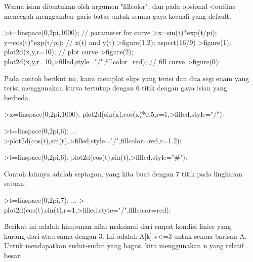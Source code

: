 \documentclass[12pt,arial,letterpaper]{book}
\begin{document}
\begin{eulercomment}
\begin{eulercomment}
\begin{eulercomment}
\begin{eulercomment}
\begin{eulercomment}
\begin{eulercomment}
\begin{eulercomment}
\begin{eulercomment}
\begin{eulercomment}
\begin{eulercomment}
\begin{eulercomment}
\begin{eulercomment}
\begin{eulercomment}
\begin{eulercomment}
\begin{eulercomment}
\begin{eulercomment}
\begin{eulercomment}
Warna isian ditentukan oleh argumen "fillcolor", dan pada opsional
\textless{}outline mencegah menggambar garis batas untuk semua gaya kecuali yang
default.
\end{eulercomment}
\begin{eulerprompt}
>t=linspace(0,2pi,1000); // parameter for curve
>x=sin(t)*exp(t/pi); y=cos(t)*exp(t/pi); // x(t) and y(t)
>figure(1,2); aspect(16/9)
>figure(1); plot2d(x,y,r=10); // plot curve
>figure(2); plot2d(x,y,r=10,>filled,style="/",fillcolor=red); // fill curve
>figure(0):
\end{eulerprompt}
\begin{eulercomment}
Pada contoh berikut ini, kami memplot elips yang terisi dan dua segi
enam yang terisi menggunakan kurva tertutup dengan 6 titik dengan gaya
isian yang berbeda.
\end{eulercomment}
\begin{eulerprompt}
>x=linspace(0,2pi,1000); plot2d(sin(x),cos(x)*0.5,r=1,>filled,style="/"):
\end{eulerprompt}
\begin{eulerprompt}
>t=linspace(0,2pi,6); ...
>plot2d(cos(t),sin(t),>filled,style="/",fillcolor=red,r=1.2):
\end{eulerprompt}
\begin{eulerprompt}
>t=linspace(0,2pi,6); plot2d(cos(t),sin(t),>filled,style="#"):
\end{eulerprompt}
\begin{eulercomment}
Contoh lainnya adalah septagon, yang kita buat dengan 7 titik pada
lingkaran satuan.
\end{eulercomment}
\begin{eulerprompt}
>t=linspace(0,2pi,7);  ...
> plot2d(cos(t),sin(t),r=1,>filled,style="/",fillcolor=red):
\end{eulerprompt}
\begin{eulercomment}
Berikut ini adalah himpunan nilai maksimal dari empat kondisi linier
yang kurang dari atau sama dengan 3. Ini adalah A[k].v\textless{}=3 untuk semua
barisan A. Untuk mendapatkan sudut-sudut yang bagus, kita menggunakan
n yang relatif besar.
\end{eulercomment}

\end{eulercomment}
\end{eulercomment}
\end{eulercomment}
\end{eulercomment}
\end{eulercomment}
\end{eulercomment}
\end{eulercomment}
\end{eulercomment}
\end{eulercomment}
\end{eulercomment}
\end{eulercomment}
\end{eulercomment}
\end{eulercomment}
\end{eulercomment}
\end{eulercomment}
\end{eulercomment}
\end{document}
